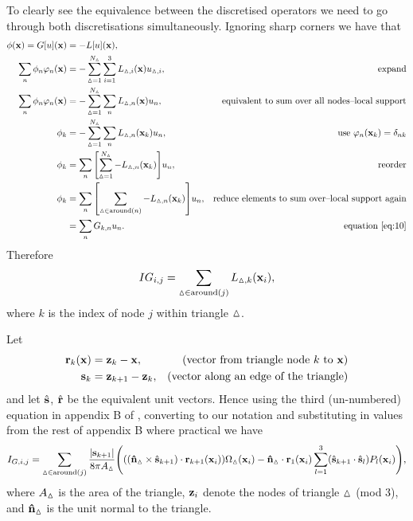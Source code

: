 To clearly see the equivalence between the discretised operators we need to go through both discretisations simultaneously.
Ignoring sharp corners we have that
\begin{equation}
  \begin{aligned}
    \phi(\mathbf{x}) = G[u](\mathbf{x}) &= -L[u](\mathbf{x}), \\
    \sum_{n} \phi_n \varphi_n(\mathbf{x}) 
    &= - \sum_{\vartriangle=1}^{N_\vartriangle} \sum_{i=1}^{3} L_{\vartriangle,i}(\mathbf{x}) u_{\vartriangle,i}, 
    \quad\quad&\text{expand}\\
    \sum_{n} \phi_n \varphi_n(\mathbf{x}) 
    &= - \sum_{\vartriangle=1}^{N_\vartriangle} \sum_n L_{\vartriangle,n}(\mathbf{x}) u_n, 
    &\text{equivalent to sum over all nodes--local support}\\
    \phi_k &= - \sum_{\vartriangle=1}^{N_\vartriangle} \sum_n L_{\vartriangle,n}(\mathbf{x}_k) u_n, 
    &\text{use $\varphi_n(\mathbf{x}_k) = \delta_{nk}$}\\
    \phi_k &= \sum_n {\left[ \sum_{\vartriangle=1}^{N_\vartriangle} -L_{\vartriangle,n}(\mathbf{x}_k) \right]} u_n, 
    &\text{reorder}\\
    \phi_k &= \sum_n {\left[ \sum_{\vartriangle \in \text{around}(n)} -L_{\vartriangle,n}(\mathbf{x}_k) \right]} u_n,
    &\text{reduce elements to sum over--local support again}\\
    &= \sum_n G_{k,n} u_n. 
    &\text{equation~\eqref{eq:10}}
  \end{aligned}
\end{equation}
Therefore 
\begin{equation}
  IG_{i,j} = \sum_{\vartriangle \in \text{around}(j)} L_{\vartriangle,k}(\mathbf{x}_i),
\end{equation}
where $k$ is the index of node $j$ within triangle $\vartriangle$.

Let
\begin{equation}
  \begin{aligned}
    \mathbf{r}_k(\mathbf{x}) &= \mathbf{z}_k - \mathbf{x}, &\quad \text{(vector from triangle node $k$ to $\mathbf{x}$)} \\
    {\mathbf{s}}_k &= \mathbf{z}_{k+1} - \mathbf{z}_k, & \text{(vector along an edge of the triangle)} \\
  \end{aligned}
\end{equation}
and let $\hat{{\mathbf{s}}}$, $\hat{\mathbf{r}}$ be the equivalent unit vectors.
Hence using the third (un-numbered) equation in appendix B of \cite{Lindholm1984}, converting to our notation and substituting in values from the rest of appendix B where practical we have
\begin{equation}
  \begin{aligned}
    \label{eq:analytic-bem-integral}
    I_{G,i,j} &= \sum_{\vartriangle \in \text{around}(j)} \frac{\left|{{\mathbf{s}}_{k+1}} \right|}{8 \pi A_\vartriangle} {\left( 
      {\left( (\mathbf{\hat{n}}_\vartriangle \times \hat{{\mathbf{s}}}_{k+1}) \cdot \mathbf{r}_{k+1}(\mathbf{x}_i) \right)} \Omega_\vartriangle(\mathbf{x}_i) 
      - \mathbf{\hat{n}}_\vartriangle \cdot \mathbf{r}_1(\mathbf{x}_i) \sum_{l=1}^{3} (\hat{{\mathbf{s}}}_{k+1} \cdot \hat{{\mathbf{s}}}_l) P_l(\mathbf{x}_i)
     \right)}, \\
  \end{aligned}
\end{equation} 
where $A_\vartriangle$ is the area of the triangle, $\mathbf{z}_i$ denote the nodes of triangle $\vartriangle$ (mod 3), and $\mathbf{\hat{n}}_\vartriangle$ is the unit normal to the triangle.

